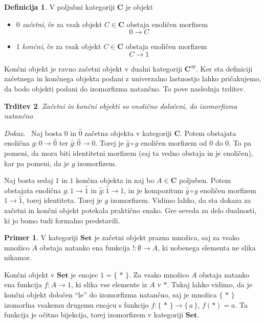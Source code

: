 \documentclass[12pt,a4paper]{book}
\theoremstyle{definition}
\newtheorem{definicija}{Definicija}[chapter]
\theoremstyle{plain}
\newtheorem{trditev}[definicija]{Trditev}
\newenvironment{dokaz}{\emph{Dokaz.}\ }{\hspace{\fill}{$\Box$}}
\theoremstyle{definition}
\newtheorem{primer}{Primer}[section]
\theoremstyle{remark}
\newcommand{\cat}[1]{\textbf{#1}}
\renewcommand{\set}[1]{\{\,#1\,\}}
\begin{document}
\begin{definicija}
V poljubni kategoriji $\cat{C}$ je objekt
\begin{itemize}
\item 0 \emph{začetni}, če za vsak objekt $C \in \cat{C}$ obstaja enoličen morfizem $$0 \to C$$
\item 1 \emph{končni}, če za vsak objekt $C \in \cat{C}$ obstaja enoličen morfizem $$C \to 1$$
\end{itemize}
\end{definicija}
Končni objekt je ravno začetni objekt v dualni kategoriji $\cat{C}^{op}$. Ker sta definiciji začetnega in končnega objekta podani z univerzalno lastnostjo lahko pričakujemo, da bodo objekti podani do izomorfizma natančno. To pove naslednja trditev.

\begin{trditev}
Začetni in končni objekti so enolično določeni, do izomorfizma natančno
\end{trditev}
\begin{dokaz}
Naj bosta $0$ in $\hat{0}$ začetna objekta v kategoriji $\cat{C}$. Potem obstajata enolična $g : 0 \to \hat{0}$ ter $\hat{g} : \hat{0} \to 0$. Torej je $\hat{g} \circ g$ enoličen morfizem od 0 do 0. To pa pomeni, da mora biti identitetni morfizem (saj ta vedno obstaja in je enoličen), kar pa pomeni, da je $g$ izomorfizem.

Naj bosta sedaj $1$ in $\hat{1}$ končna objekta in naj bo $A \in \cat{C}$ poljuben. Potem obstajata enolična $g : 1 \to \hat{1}$ in $\hat{g} : \hat{1} \to 1$, in je kompozitum $\hat{g} \circ g$ enoličen morfizem $1 \to \hat{1}$, torej identiteta. Torej je $g$ izomorfizem.
\end{dokaz}
Vidimo lahko, da sta dokaza za začetni in končni objekt potekala praktično enako. Gre seveda za delo dualnosti, ki jo bomo tudi formalno predstavili.

\begin{primer}
V kategoriji $\cat{Set}$ je začetni objekt prazna množica, saj za vsako množico $A$ obstaja natanko ena funkcija $! : \emptyset \to A$, ki nobenega elementa ne slika nikamor. 

Končni objekt v $\cat{Set}$ je enojec $1 = \set{*}$. Za vsako množico $A$ obstaja natanko ena funkcija $f : A \to 1$, ki slika vse elemente iz $A$ v $*$. Tukaj lahko vidimo, da je končni objekt določen "`le"' do izomorfizma natančno, saj je množica $\set{*}$ izomorfna vsakemu drugemu enojcu s funkcijo $f : \set{*} \to \set{a}$, $f(*) = a$. Ta funkcija je očitno bijekcija, torej izomorfizem v kategoriji $\cat{Set}$.
\end{primer}
\end{document}
